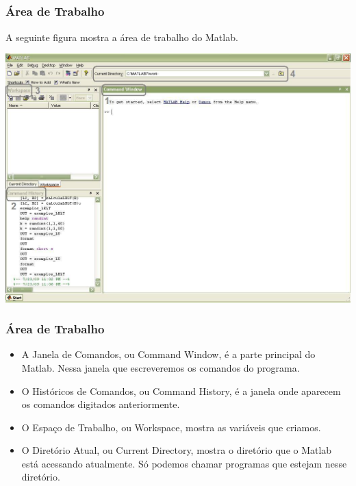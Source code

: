 \documentclass{beamer}
\begin{document}
\subsection[\'Area de Trabalho]{}
\frame
{
  \frametitle{\'Area de Trabalho}

  A seguinte figura mostra a \'area de trabalho do Matlab.

  \begin{center}
  \includegraphics[scale=0.35]{figura2.jpg}
  \end{center}

}
\begin{frame}
 \frametitle{\'Area de Trabalho}

 \begin{itemize}
 \item<1-> A Janela de Comandos, ou Command Window, \'e a parte principal do Matlab. Nessa janela que escreveremos os comandos do programa.
 \item<2-> O Hist\'oricos de Comandos, ou Command History, \'e a janela onde aparecem os comandos digitados anteriormente.
 \item<3-> O Espa\c{c}o de Trabalho, ou Workspace, mostra as vari\'aveis que criamos.
  \item<4-> O Diret\'orio Atual, ou Current Directory, mostra o diret\'orio que o Matlab est\'a acessando atualmente. S\'o podemos chamar programas que estejam nesse diret\'orio.
 \end{itemize}
\end{frame}
\end{document}
